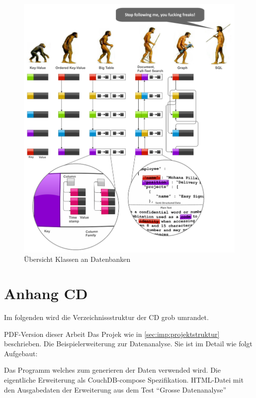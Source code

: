 \begin{figure}
    \centering
    \includegraphics[width=\textwidth]{images/databases-overview.png}
    \caption{Übersicht Klassen an Datenbanken}
    \label{fig:klassen-datenbanken}
\end{figure}

\chapter{Anhang CD}

Im folgenden wird die Verzeichnissstruktur der CD grob umrandet.

\begin{itemize}
     PDF-Version dieser Arbeit
    \dhitem[juggler] Das Projek wie in \cref{sec:imp:projektstruktur} beschrieben.
    \dhitem[evolve] Die Beispielerweiterung zur Datenanalyse.
    Sie ist im Detail wie folgt Aufgebaut:
    \begin{itemize}
            \dhitem[funfind.py] Das Programm welches zum generieren der Daten verwended wird.
            \dhitem[composeapp] Die eigentliche Erweiterung als CouchDB-compose Spezifikation.
             HTML-Datei mit den Ausgabedaten der Erweiterung aus dem Test ``Grosse Datenanalyse''
    \end{itemize}
\end{itemize}

